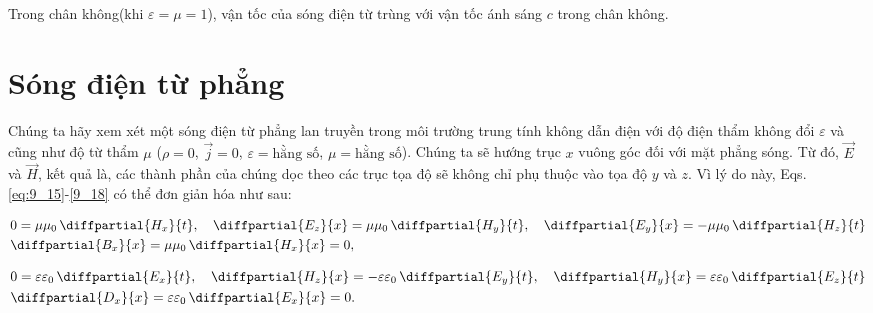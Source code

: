 \noindent
Trong chân không(khi $\varepsilon=\mu=1$), vận tốc của sóng điện từ trùng với vận tốc ánh sáng $c$ trong chân không.
\section{Sóng điện từ phẳng}\label{sec:15_2}

Chúng ta hãy xem xét một sóng điện từ phẳng lan truyền trong môi trường trung tính không dẫn điện với độ điện thẩm không đổi $\varepsilon$ và cũng như độ từ thẩm $\mu$ ($\rho=0$, $\vec{j}=0$, $\varepsilon=\text{hằng số}$, $\mu=\text{hằng số}$).
Chúng ta sẽ hướng trục $x$ vuông góc đối với mặt phẳng sóng.
Từ đó, $\vec{E}$ và $\vec{H}$, kết quả là,  các thành phần của chúng dọc theo các trục tọa độ sẽ không chỉ  phụ thuộc vào tọa độ $y$ và $z$.
Vì lý do này, Eqs. \eqref{eq:9_15}-\eqref{9_18} có thể đơn giản hóa như sau:

\begin{align}
    & 0 = \mu\mu_0\, \diffpartial{H_x}{t},\quad  \diffpartial{E_z}{x} = \mu\mu_0\, \diffpartial{H_y}{t}, \quad \diffpartial{E_y}{x} = -\mu\mu_0\, \diffpartial{H_z}{t} \label{eq:15_11} \\
    & \diffpartial{B_x}{x} = \mu\mu_0\, \diffpartial{H_x}{x} = 0,\label{eq:15_12}
\end{align}

\begin{align}
    & 0 = \varepsilon\varepsilon_0\, \diffpartial{E_x}{t}, \quad  \diffpartial{H_z}{x} = -\varepsilon \varepsilon_0\, \diffpartial{E_y}{t}, \quad \diffpartial{H_y}{x} = \varepsilon\varepsilon_0\, \diffpartial{E_z}{t} \label{eq:15_13}\\
    & \diffpartial{D_x}{x} = \varepsilon \varepsilon_0\, \diffpartial{E_x}{x} = 0.\label{eq:15_14}
\end{align}

